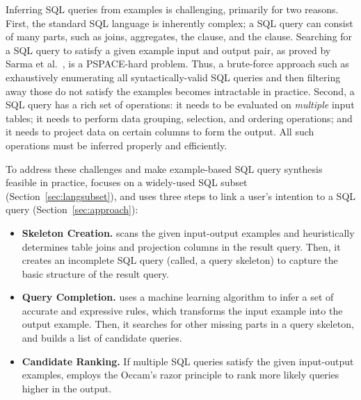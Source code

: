 Inferring SQL queries from examples is challenging,
primarily for two reasons. First, the standard SQL
language is inherently complex; a SQL query can consist
of many parts, such as joins, aggregates,
the  clause, and the  clause.
Searching for a SQL query
to satisfy a given example input and output pair,
as proved by Sarma et al.~\cite{DasSarma:2010},
is a PSPACE-hard problem. Thus,
a brute-force approach such as exhaustively
enumerating all
syntactically-valid SQL queries and then
filtering away those do not satisfy the examples
becomes intractable in practice. 
Second, a SQL query has a rich set of operations: it
needs to be evaluated on \textit{multiple} input tables;
it needs to perform data grouping, selection, and ordering
operations; and it needs to project data on certain columns to
form the output.
All such operations must be inferred properly and efficiently.%


To address these challenges and make example-based
SQL query synthesis feasible in practice,
\ourtool focuses on a widely-used SQL subset (Section~\ref{sec:langsubset}),
and uses three steps to link a user's intention to
a SQL query (Section~\ref{sec:approach}):



\begin{itemize}
\item \textbf{Skeleton Creation.} \ourtool scans the
given input-output examples and heuristically
determines table joins and projection columns in
the result query. Then, it creates an
incomplete SQL query (called, a query skeleton) to
capture the basic structure of the result query.

\item \textbf{Query Completion.} \ourtool
uses a machine learning algorithm to infer a set of accurate
and expressive rules, which transforms the input
example into the output example. Then, it
searches for other missing parts in a query skeleton,
and builds a list of candidate queries. 


\item \textbf{Candidate Ranking.} If multiple SQL
queries satisfy the given input-output examples,
\ourtool employs the Occam's razor principle to
rank more likely queries higher in the output.
\end{itemize}


